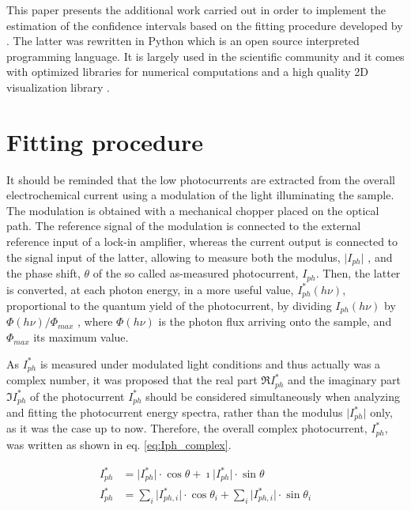 \documentclass[10pt, 3p, sort&compress]{elsarticle}
\begin{document}
This paper presents the additional work carried out in order to implement the estimation of the confidence intervals based on the fitting procedure developed by \citet{petit2013}. The latter was rewritten in Python which is an open source interpreted programming language. It is largely used in the scientific community \citep{langtangen2012, millman2011, kiusalaas2010, oliphant2007} and it comes with optimized libraries for numerical computations \citep{vanderwalt2011,jones2020} and a high quality 2D visualization library \citep{hunter2007}.


\section{Fitting procedure}
It should be reminded that the low photocurrents are extracted from the overall electrochemical current using a modulation of the light illuminating the sample. The modulation is obtained with a mechanical chopper placed on the optical path. The reference signal of the modulation is connected to the external reference input of a lock-in amplifier, whereas the current output is connected to the signal input of the latter, allowing to measure both the modulus, $\vert I_{ph} \vert$ , and the phase shift, $\theta$ of the so called as-measured photocurrent, $I_{ph}$. Then, the latter is converted, at each photon energy, in a more useful value, $I_{ph}^* (h\nu)$, proportional to the quantum yield of the photocurrent, by dividing $I_{ph}(h\nu)$ by $\Phi(h\nu)/\Phi_{max}$  , where $\Phi(h\nu)$ is the photon flux arriving onto the sample, and $\Phi_{max}$ its maximum value. 

As $I_{ph}^*$ is measured under modulated light conditions and thus actually was a complex number, it was proposed that the real part $\Re I_{ph}^* $ and the imaginary part $\Im I_{ph}^*$ of the photocurrent $I_{ph}^*$ should be considered simultaneously when analyzing and fitting the photocurrent energy spectra, rather than the modulus $\vert I_{ph}^* \vert$ only, as it was the case up to now. Therefore, the overall complex photocurrent, $I_{ph}^*$, was written as shown in eq. \ref{eq:Iph_complex}.

\begin{equation}
\begin{split}
I_{ph}^* &= \vert I_{ph}^* \vert \cdot \cos \theta + \imath \vert I_{ph}^* \vert \cdot \sin \theta \\
I_{ph}^* &= \sum _i \vert I_{ph,i}^* \vert \cdot \cos \theta _i + \sum _i \vert I_{ph,i}^* \vert \cdot \sin \theta _i 
\end{split}
\label{eq:Iph_complex}
\end{equation}
\end{document}
